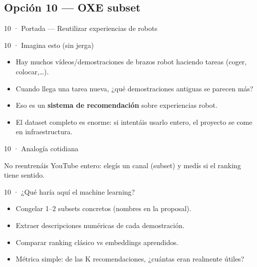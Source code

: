 \subsection{Opción 10 --- OXE subset}

\begin{frame}{10 · Portada --- Reutilizar experiencias de robots}
\end{frame}

\begin{frame}{10 · Imagina esto (sin jerga)}
  \begin{itemize}
    \item Hay muchos vídeos/demostraciones de brazos robot haciendo tareas (coger, colocar,\ldots).
    \item Cuando llega una tarea nueva, ¿qué demostraciones antiguas se parecen más?
    \item Eso es un \textbf{sistema de recomendación} sobre experiencias robot.
    \item El dataset completo es enorme: si intentáis usarlo entero, el proyecto se come en infraestructura.
  \end{itemize}
\end{frame}

\begin{frame}{10 · Analogía cotidiana}
  \begin{center}
  \end{center}
  \vspace{0.35em}
  No reentrenáis YouTube entero: elegís un canal (subset) y medís si el ranking tiene sentido.
\end{frame}

\begin{frame}{10 · ¿Qué haría aquí el machine learning?}
  \begin{itemize}
    \item Congelar 1--2 subsets concretos (nombres en la proposal).
    \item Extraer descripciones numéricas de cada demostración.
    \item Comparar ranking clásico vs embeddings aprendidos.
    \item Métrica simple: de las K recomendaciones, ¿cuántas eran realmente útiles?
  \end{itemize}
\end{frame}

